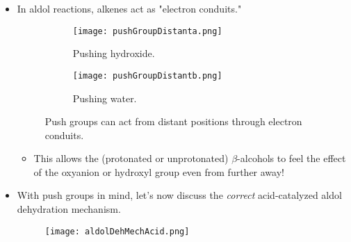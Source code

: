 \documentclass[../notes.tex]{subfiles}
\begin{document}
\begin{itemize}
\begin{figure}[h!]
\begin{subfigure}[b]{0.37\linewidth}
            \centering
            \texttt{[image: pushGroupb.png]}
            \caption{Pushing water.}
            \label{fig:pushGroupb}
        \end{subfigure}
        \caption{Push groups in tetrahedral intermediates.}
        \label{fig:pushGroup}
    \end{figure}
    \begin{itemize}
        \item Hydroxide is a bad leaving group, but if we have a \textbf{push group} (ideally an anionic species) in the tetrahedral intermediate, we can kick it out (Figure \ref{fig:pushGroupa}).
        \item In acidic media,  is typically not that good of a push group, but it is able to push out water, which can then come back and remove the proton (Figure \ref{fig:pushGroupb}).
    \end{itemize}
    \item In aldol reactions, alkenes act as "electron conduits."
    \begin{figure}[h!]
        \centering
        \begin{subfigure}[b]{0.37\linewidth}
            \centering
            \texttt{[image: pushGroupDistanta.png]}
            \caption{Pushing hydroxide.}
            \label{fig:pushGroupDistanta}
        \end{subfigure}
        \begin{subfigure}[b]{0.37\linewidth}
            \centering
            \texttt{[image: pushGroupDistantb.png]}
            \caption{Pushing water.}
            \label{fig:pushGroupDistantb}
        \end{subfigure}
        \caption{Push groups can act from distant positions through electron conduits.}
        \label{fig:pushGroupDistant}
    \end{figure}
    \begin{itemize}
        \item This allows the (protonated or unprotonated) $\beta$-alcohols to feel the effect of the oxyanion or hydroxyl group even from further away!
    \end{itemize}
    \item With push groups in mind, let's now discuss the \emph{correct} acid-catalyzed aldol dehydration mechanism.
    \begin{figure}[h!]
        \centering
        \texttt{[image: aldolDehMechAcid.png]}

\end{figure}
\end{itemize}
\end{document}
